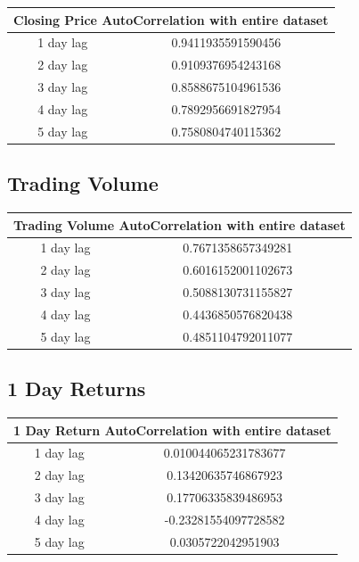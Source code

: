 \begin{center}
\begin{tabular}{ c c } 
\hline
\multicolumn{2}{|c|}{Closing Price AutoCorrelation with entire dataset} \\
\hline
1 day lag & 0.9411935591590456 \\
2 day lag & 0.9109376954243168 \\
3 day lag & 0.8588675104961536 \\
4 day lag & 0.7892956691827954 \\
5 day lag & 0.7580804740115362
\end{tabular}
\end{center}

\subsection{Trading Volume}

\begin{center}
\begin{tabular}{ c c }
\hline
\multicolumn{2}{|c|}{Trading Volume AutoCorrelation with entire dataset} \\
\hline
1 day lag & 0.7671358657349281 \\
2 day lag & 0.6016152001102673 \\
3 day lag & 0.5088130731155827 \\
4 day lag & 0.4436850576820438 \\
5 day lag & 0.4851104792011077
\end{tabular}
\end{center}

\subsection{1 Day Returns}

\begin{center}
\begin{tabular}{ c c }
\hline
\multicolumn{2}{|c|}{1 Day Return AutoCorrelation with entire dataset} \\
\hline
1 day lag & 0.010044065231783677 \\
2 day lag & 0.13420635746867923 \\
3 day lag & 0.17706335839486953 \\
4 day lag & -0.23281554097728582 \\
5 day lag & 0.0305722042951903
\end{tabular}
\end{center}

